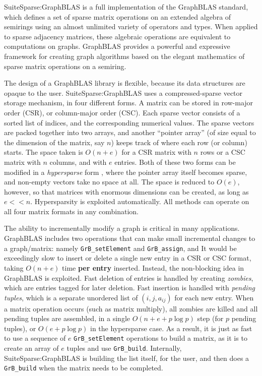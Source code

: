 
SuiteSparse:GraphBLAS is a full implementation of the GraphBLAS standard, which
defines a set of sparse matrix operations on an extended algebra of semirings
using an almost unlimited variety of operators and types.  When applied to
sparse adjacency matrices, these algebraic operations are equivalent to
computations on graphs.  GraphBLAS provides a powerful and expressive framework
for creating graph algorithms based on the elegant mathematics of sparse matrix
operations on a semiring.

The design of a GraphBLAS library is flexible, because its data structures are
opaque to the user.  SuiteSparse:GraphBLAS uses a compressed-sparse vector
storage mechanism, in four different forms.  A matrix can be stored in
row-major order (CSR), or column-major order (CSC).  Each sparse vector
consists of a sorted list of indices, and the corresponding numerical values.
The sparse vectors are packed together into two arrays, and another ``pointer
array'' (of size equal to the dimension of the matrix, say $n$) keeps track of
where each row (or column) starts.  The space taken is $O(n+e)$ for a CSR
matrix with $n$ rows or a CSC matrix with $n$ columns, and with $e$ entries.
Both of these two forms can be modified in a {\em hypersparse} form
\cite{BulucGilbert08}, where the pointer array itself becomes sparse, and
non-empty vectors take no space at all.  The space is reduced to $O(e)$,
however, so that matrices with enormous dimensions can be created, as long as
$e << n$.  Hypersparsity is exploited automatically.  All methods can operate
on all four matrix formats in any combination.

The ability to incrementally modify a graph is critical in many applications.
GraphBLAS includes two operations that can make small incremental changes to a
graph/matrix:  namely \verb'GrB_setElement' and \verb'GrB_assign', and It would
be exceedingly slow to insert or delete a single new entry in a CSR or CSC
format, taking $O(n+e)$ time {\bf per entry} inserted.  Instead, the
non-blocking idea in GraphBLAS is exploited.  Fast deletion of entries is
handled by creating {\em zombies}, which are entries tagged for later deletion.
Fast insertion is handled with {\em pending tuples}, which is a separate
unordered list of $(i,j,a_{ij})$ for each new entry.  When a matrix operation
occurs (such as matrix multiply), all zombies are killed and all pending tuples
are assembled, in a single $O(n+ e + p \log p)$ step (for $p$ pending tuples),
or $O(e +p \log p)$ in the hypersparse case.  As a result, it is just as fast
to use a sequence of $e$ \verb'GrB_setElement' operations to build a matrix, as
it is to create an array of $e$ tuples and use \verb'GrB_build'.  Internally,
SuiteSparse:GraphBLAS is building the list itself, for the user, and then does
a \verb'GrB_build' when the matrix needs to be completed.

